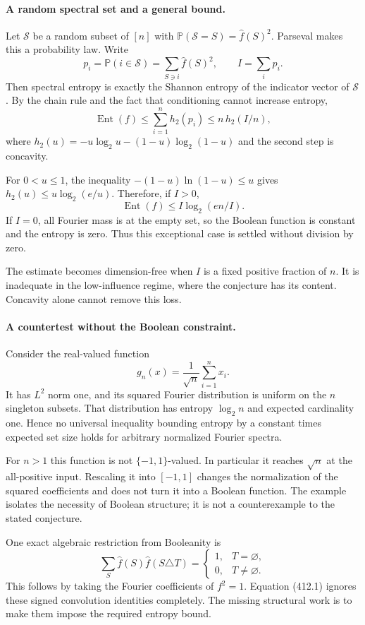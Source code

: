 \documentclass[11pt]{article}
\begin{document}
\paragraph{A random spectral set and a general bound.}
Let $\mathcal S$ be a random subset of $[n]$ with
$\mathbb P(\mathcal S=S)=\widehat f(S)^2$. Parseval makes this a probability law. Write
\[
 p_i=\mathbb P(i\in\mathcal S)
       =\sum_{S\ni i}\widehat f(S)^2,\qquad
 I=\sum_i p_i.
\]
Then spectral entropy is exactly the Shannon entropy of the indicator vector of $\mathcal S$. By the chain rule and the fact that conditioning cannot increase entropy,
\[
 \operatorname{Ent}(f)\le\sum_{i=1}^n h_2(p_i)
       \le n\,h_2(I/n),
 \tag{412.1}
\]
where $h_2(u)=-u\log_2u-(1-u)\log_2(1-u)$ and the second step is concavity.

For $0<u\le1$, the inequality
$-(1-u)\ln(1-u)\le u$ gives
$h_2(u)\le u\log_2(e/u)$. Therefore, if $I>0$,
\[
 \operatorname{Ent}(f)\le I\log_2(en/I).
 \tag{412.2}
\]
If $I=0$, all Fourier mass is at the empty set, so the Boolean function is constant and the entropy is zero. Thus this exceptional case is settled without division by zero.

The estimate becomes dimension-free when $I$ is a fixed positive fraction of $n$. It is inadequate in the low-influence regime, where the conjecture has its content. Concavity alone cannot remove this loss.

\paragraph{A countertest without the Boolean constraint.}
Consider the real-valued function
\[
 g_n(x)=\frac1{\sqrt n}\sum_{i=1}^n x_i.
\]
It has $L^2$ norm one, and its squared Fourier distribution is uniform on the $n$ singleton subsets. That distribution has entropy $\log_2 n$ and expected cardinality one. Hence no universal inequality bounding entropy by a constant times expected set size holds for arbitrary normalized Fourier spectra.

For $n>1$ this function is not $\{-1,1\}$-valued. In particular it reaches $\sqrt n$ at the all-positive input. Rescaling it into $[-1,1]$ changes the normalization of the squared coefficients and does not turn it into a Boolean function. The example isolates the necessity of Boolean structure; it is not a counterexample to the stated conjecture.

One exact algebraic restriction from Booleanity is
\[
 \sum_S\widehat f(S)\widehat f(S\triangle T)
   =\begin{cases}1,&T=\varnothing,\\0,&T\ne\varnothing.\end{cases}
 \tag{412.3}
\]
This follows by taking the Fourier coefficients of $f^2=1$. Equation (412.1) ignores these signed convolution identities completely. The missing structural work is to make them impose the required entropy bound.
\end{document}

